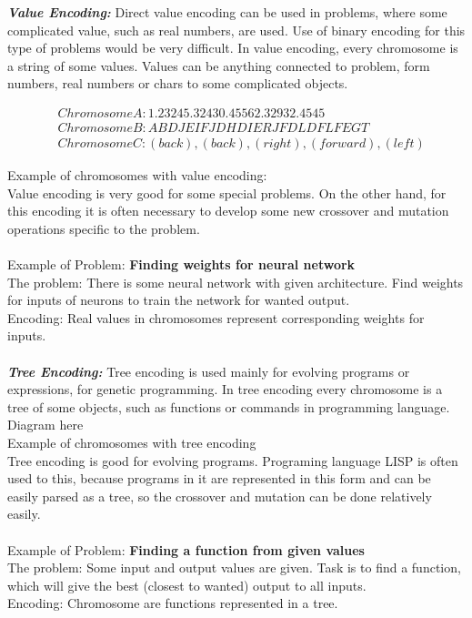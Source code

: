 \documentclass[a4paper, 12pt]{article}
\begin{document}
\textbf{\textit{Value Encoding: }}
Direct value encoding can be used in problems, where some complicated value, such as real numbers, are used. Use of binary encoding for this
type of problems would be very difficult. In value encoding, every chromosome is a string of some values. Values can be anything connected to 
problem, form numbers, real numbers or chars to some complicated objects.
\begin{center}
\begin{align*}
&Chromosome A: 1.2324  5.3243  0.4556  2.3293  2.4545\\
&Chromosome B: ABDJEIFJDHDIERJFDLDFLFEGT\\
&Chromosome C: (back), (back), (right), (forward), (left)
\end{align*}
\end{center}
Example of chromosomes with value encoding:\\
Value encoding is very good for some special problems. On the other hand, for this encoding it is often necessary to develop some new crossover and mutation operations specific to the problem.\\~\\
Example of Problem: \textbf{Finding weights for neural network}\\
The problem: There is some neural network with given architecture. Find weights for inputs of neurons to train the network for wanted output.\\
Encoding: Real values in chromosomes represent corresponding weights for inputs.\\~\\
\textbf{\textit{Tree Encoding: }}
Tree encoding is used mainly for evolving programs or expressions, for genetic programming. In tree encoding every chromosome is a tree of some objects, such as functions or commands in programming language. \\
Diagram here\\
 Example of chromosomes with tree encoding\\
Tree encoding is good for evolving programs. Programing language LISP is often used to this, because programs in it are represented in this form and can be easily parsed as a tree, so the crossover and mutation can be done relatively easily.\\~\\
Example of Problem: \textbf{Finding a function from given values}\\
The problem: Some input and output values are given. Task is to find a function, which will give the best (closest to wanted) output to all inputs.\\
Encoding: Chromosome are functions represented in a tree.
\end{document}
